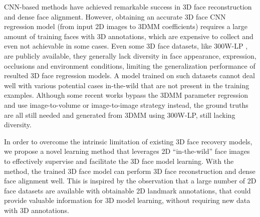 \documentclass[10pt,twocolumn,letterpaper]{article}
\begin{document}
CNN-based methods \cite{jourabloo2016large, zhu2016face, liu2016joint, liu2017dense, tuan2017regressing, tran2018nonlinear} have achieved remarkable success   in 3D face reconstruction and dense face alignment. However,  obtaining   an accurate 3D face CNN regression model (from input 2D images to 3DMM coefficients) requires a large amount of training faces  with 3D annotations, which are expensive to collect and even not achievable in some cases. Even some 3D face datasets, like 300W-LP \cite{zhu2016face}, are publicly  available, they generally lack diversity in face appearance, expression, occlusions and environment conditions, limiting the generalization performance of resulted 3D face regression models.
A model trained on such datasets  cannot deal well with various  potential cases in-the-wild that are not present in the training examples. Although some recent works bypass the 3DMM parameter regression and use image-to-volume \cite{jackson2017large} or image-to-image \cite{feng2018joint} strategy instead, the ground truths are all still needed and  generated from 3DMM using 300W-LP, still lacking diversity.

In order to overcome the intrinsic limitation of existing 3D face recovery models, we propose a novel learning method that leverages 2D ``in-the-wild'' face images to effectively supervise and facilitate the 3D face model learning. With the method, the trained 3D face model can perform 3D face reconstruction and dense face alignment well.  This is inspired by the observation that a large number of 2D face datasets \cite{bansal2017umdfaces, liu2015deep, koestinger2011annotated, ramanan2012face, sagonas2013300} are available with obtainable 2D landmark  annotations,  that could provide valuable information for 3D model learning, without requiring  new  data with 3D annotations.
\end{document}
